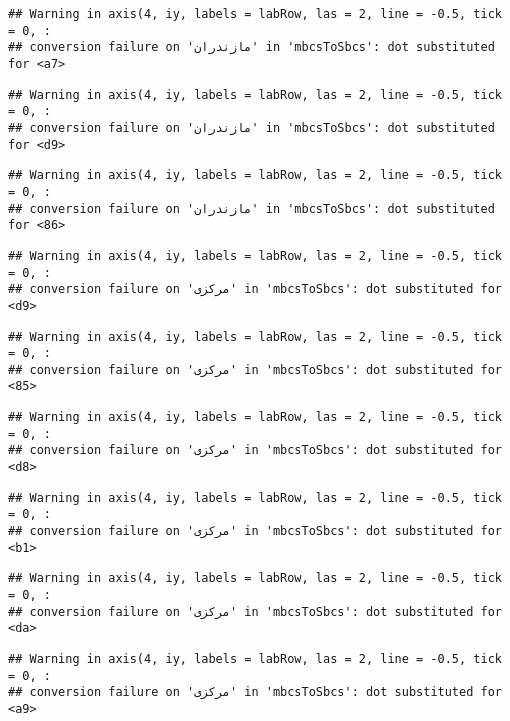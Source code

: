 \documentclass[
]{article}
\begin{document}
\begin{verbatim}
## Warning in axis(4, iy, labels = labRow, las = 2, line = -0.5, tick = 0, :
## conversion failure on 'مازندران' in 'mbcsToSbcs': dot substituted for <a7>
\end{verbatim}

\begin{verbatim}
## Warning in axis(4, iy, labels = labRow, las = 2, line = -0.5, tick = 0, :
## conversion failure on 'مازندران' in 'mbcsToSbcs': dot substituted for <d9>
\end{verbatim}

\begin{verbatim}
## Warning in axis(4, iy, labels = labRow, las = 2, line = -0.5, tick = 0, :
## conversion failure on 'مازندران' in 'mbcsToSbcs': dot substituted for <86>
\end{verbatim}

\begin{verbatim}
## Warning in axis(4, iy, labels = labRow, las = 2, line = -0.5, tick = 0, :
## conversion failure on 'مرکزی' in 'mbcsToSbcs': dot substituted for <d9>
\end{verbatim}

\begin{verbatim}
## Warning in axis(4, iy, labels = labRow, las = 2, line = -0.5, tick = 0, :
## conversion failure on 'مرکزی' in 'mbcsToSbcs': dot substituted for <85>
\end{verbatim}

\begin{verbatim}
## Warning in axis(4, iy, labels = labRow, las = 2, line = -0.5, tick = 0, :
## conversion failure on 'مرکزی' in 'mbcsToSbcs': dot substituted for <d8>
\end{verbatim}

\begin{verbatim}
## Warning in axis(4, iy, labels = labRow, las = 2, line = -0.5, tick = 0, :
## conversion failure on 'مرکزی' in 'mbcsToSbcs': dot substituted for <b1>
\end{verbatim}

\begin{verbatim}
## Warning in axis(4, iy, labels = labRow, las = 2, line = -0.5, tick = 0, :
## conversion failure on 'مرکزی' in 'mbcsToSbcs': dot substituted for <da>
\end{verbatim}

\begin{verbatim}
## Warning in axis(4, iy, labels = labRow, las = 2, line = -0.5, tick = 0, :
## conversion failure on 'مرکزی' in 'mbcsToSbcs': dot substituted for <a9>
\end{verbatim}
\end{document}
